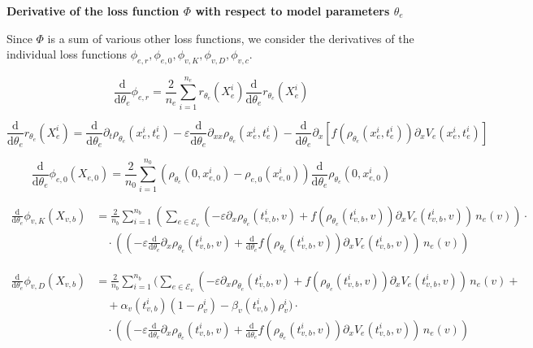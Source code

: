 \textbf{Derivative of the loss function $\Phi$ with respect to model parameters $\theta_e$}

Since $\Phi$ is a sum of various other loss functions, we consider the derivatives of the individual loss functions $\phi_{e,r}, \phi_{e,0}, \phi_{v,K}, \phi_{v,D}, \phi_{v,c}$. 

\begin{equation*}
    \frac{\mathrm{d}}{\mathrm{d} \theta_e} \phi_{e,r} = \frac{2}{n_e} \sum_{i=1}^{n_e} r_{\theta_e} (X_e^i) \frac{\mathrm{d}}{\mathrm{d} \theta_e} r_{\theta_e} (X_e^i) 
\end{equation*}

\begin{equation*}
    \frac{\mathrm{d}}{\mathrm{d} \theta_e} r_{\theta_e} (X_e^i) =  \frac{\mathrm{d}}{\mathrm{d} \theta_e} \partial_t \rho_{\theta_{e}} (x_{e}^i , t_{e}^i) - \varepsilon \frac{\mathrm{d}}{\mathrm{d} \theta_e} \partial_{xx} \rho_{\theta_e}(x_e^i, t_e^i) - \frac{\mathrm{d}}{\mathrm{d} \theta_e} \partial_x [f(\rho_{\theta_e}(x_e^i, t_e^i)) \partial_x V_e(x_e^i, t_e^i)] 
\end{equation*}

\begin{equation*}
    \frac{\mathrm{d}}{\mathrm{d} \theta_e} \phi_{e,0} (X_{e,0}) = \frac{2}{n_0} \sum_{i=1}^{n_0} (\rho_{\theta_e} (0,x_{e,0}^i) - \rho_{e,0}(x_{e,0}^i)) \frac{\mathrm{d}}{\mathrm{d} \theta_e} \rho_{\theta_e} (0,x_{e,0}^i)
\end{equation*}

\begin{align*}
    \frac{\mathrm{d}}{\mathrm{d} \theta_e} \phi_{v,K} (X_{v,b}) & = \frac{2}{n_b} \sum_{i=1}^{n_b} (\sum_{e \in \mathcal{E}_v} (- \varepsilon \partial_x \rho_{\theta_e} (t_{v,b}^i, v) + f(\rho_{\theta_e} (t_{v,b}^i, v)) \partial_x V_e(t_{v,b}^i, v)) \, n_e (v)) \cdot \\ 
    & \quad \cdot ((- \varepsilon \frac{\mathrm{d}}{\mathrm{d} \theta_e} \partial_x \rho_{\theta_e} (t_{v,b}^i, v) + \frac{\mathrm{d}}{\mathrm{d} \theta_e} f(\rho_{\theta_e} (t_{v,b}^i, v)) \partial_x V_e(t_{v,b}^i, v)) \, n_e (v))
\end{align*}

\begin{align*}
    \frac{\mathrm{d}}{\mathrm{d} \theta_e} \phi_{v,D} (X_{v,b}) & = \frac{2}{n_b} \sum_{i=1}^{n_b} ( \sum_{e\in \mathcal{E}_v} (-\varepsilon \partial_x \rho_{\theta_e} (t_{v,b}^i, v) + f(\rho_{\theta_e} (t_{v,b}^i, v)) \partial_x V_e(t_{v,b}^i, v)) \, n_e (v) + \\ 
    & \quad + \alpha_v(t_{v,b}^i) (1-\rho_v^i) - \beta_v(t_{v,b}^i) \rho_v^i )  \cdot \\
    & \quad \cdot ((-\varepsilon \frac{\mathrm{d}}{\mathrm{d} \theta_e} \partial_x \rho_{\theta_e} (t_{v,b}^i, v) + \frac{\mathrm{d}}{\mathrm{d} \theta_e} f(\rho_{\theta_e} (t_{v,b}^i, v)) \partial_x V_e(t_{v,b}^i, v)) \, n_e (v))
\end{align*}

